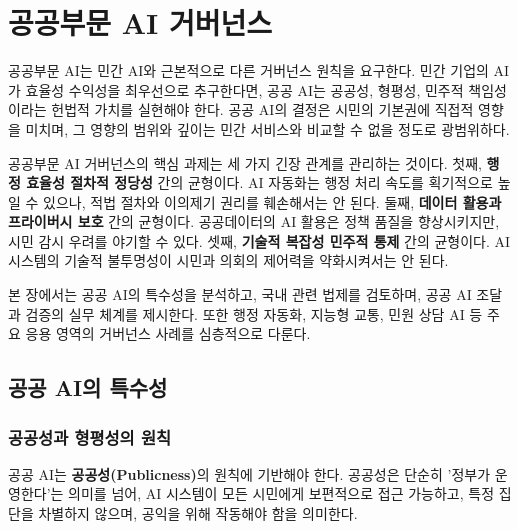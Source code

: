 
\chapter{공공부문 AI 거버넌스}
\label{ch:public_governance}

공공부문 AI는 민간 AI와 근본적으로\cite{berryhill2019hello} 다른 거버넌스 원칙을 요구한다. 민간 기업의 AI가 효율성 수익성을 최우선으로 추구한다면, 공공 AI는 공공성\cite{wirtz2019artificial}, 형평성, 민주적 책임성\cite{coglianese2017regulating}이라는 헌법적 가치를 실현해야 한다. 공공 AI의 결정은 시민의 기본권에 직접적 영향을 미치며, 그 영향의 범위와 깊이는 민간 서비스와 비교할 수 없을 정도로 광범위하다.

공공부문 AI 거버넌스의 핵심 과제는 세 가지 긴장 관계를 관리하는 것이다. 첫째, \textbf{행정 효율성 절차적 정당성} 간의 균형이다. AI 자동화는 행정 처리 속도를 획기적으로 높일 수 있으나, 적법 절차와 이의제기 권리를 훼손해서는 안 된다. 둘째, \textbf{데이터 활용과 프라이버시 보호} 간의 균형이다. 공공데이터\cite{janssen2020data}의 AI 활용은 정책 품질을 향상시키지만, 시민 감시 우려를 야기\cite{eubanks2018automating}할 수 있다. 셋째, \textbf{기술적 복잡성 민주적 통제} 간의 균형이다. AI 시스템의 기술적 불투명성\cite{arrieta2020explainable}이 시민과 의회의 제어력을 약화\cite{shneiderman2020bridging}시켜서는 안 된다.

본 장에서는 공공 AI의 특수성을 분석하고, 국내 관련 법제를 검토하며, 공공 AI 조달\cite{kuziemski2020ai}과 검증의 실무 체계를 제시한다. 또한 행정 자동화\cite{brown2019government}, 지능형 교통, 민원 상담 AI 등 주요 응용 영역의 거버넌스 사례를 심층적으로 다룬다.

\section{공공 AI의 특수성}
\label{sec:18.1}

\subsection{공공성과 형평성의 원칙}
\label{sec:18.1.1}

공공 AI는 \textbf{공공성(Publicness)}의 원칙에 기반해야 한다. 공공성은 단순히 '정부가 운영한다'는 의미를 넘어, AI 시스템이 모든 시민에게 보편적으로 접근 가능하고, 특정 집단을 차별하지 않으며, 공익을 위해 작동해야 함을 의미한다.

